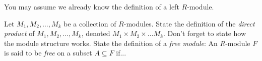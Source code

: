 \documentclass{exam}
\begin{document}
\begin{center}
\end{center}

\vspace*{1em}
You may assume we already know the definition of a left $R$-module.
\begin{questions}
    \question[2]
        Let $M_1, M_2, \dots, M_k$ be a collection of $R$-modules. State the definition of the \textit{direct product} of $M_1, 
        M_2, \dots, M_k$, denoted $M_1\times M_2 \times\dots M_k$. Don't forget to state how the module structure works.
    \question[3]
        State the definition of a \textit{free module}: An $R$-module $F$ is said to be \textit{free} on a subset $A\subseteq F$ if...
\end{questions}
\end{document}
